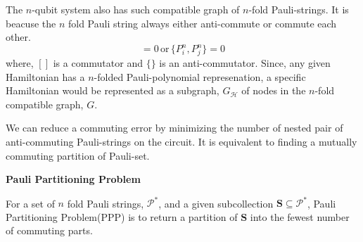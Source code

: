 \begin{center}
    \centering
    \label{fig:compatible_graph_example}
\end{center}
The $n$-qubit system also has such compatible graph of 
$n$-fold Pauli-strings. It is beacuse the $n$ fold Pauli string 
always either anti-commute or commute each other.
\begin{equation}
    [P_i^n, P_j^n] =0 \, \mbox{or} \, \{P_i^n, P_j^n\} =0
\end{equation}
where, $[]$ is a commutator and $\{\}$ is an anti-commutator.
Since, any given Hamiltonian has a $n$-folded Pauli-polynomial represenation, 
a specific Hamiltonian would be represented as a subgraph, $G_{\mathcal{H}}$ of nodes in 
the $n$-fold compatible graph, $G$.

We can reduce a commuting error 
by minimizing the number of nested pair of anti-commuting 
Pauli-strings on the circuit. 
It is equivalent to finding a mutually commuting partition
of Pauli-set.

\begin{definition}{\textbf{Pauli Partitioning Problem}}

    For a set of $n$ fold Pauli strings, $\mathcal{P}^\ast$,
    and a given subcollection $\mathbf{S} \subseteq \mathcal{P}^\ast$, 
    Pauli Partitioning Problem(PPP) is to return a partition of $\mathbf{S}$ into the fewest number of commuting parts.
\end{definition}

